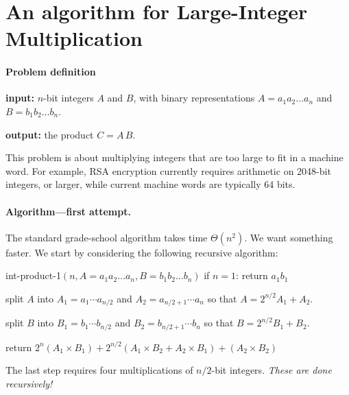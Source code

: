 
\section{An algorithm for Large-Integer Multiplication}

\paragraph{Problem definition}
\begin{mylist}
\item \textbf{input:}
  $n$-bit integers $A$ and $B$,
  with binary representations $A=a_1a_2\ldots a_n$
  and $B=b_1b_2\ldots b_n$.
\item \textbf{output:} the product $C = A \, B$.
\end{mylist}

This problem is about multiplying integers that are too large to fit in a machine word.
For example, RSA encryption currently requires arithmetic on 2048-bit integers, or larger,
while current machine words are typically 64 bits.

\paragraph{Algorithm---first attempt.}
The standard grade-school algorithm takes time $\Theta(n^2)$.
We want something faster.
We start by considering the following recursive algorithm:
\begin{myframed}
\begin{steps}
  \item[] {\sf int-product-1}$(n, A=a_1a_2\ldots a_n, B=b_1 b_2 \ldots b_n)$
    \step if $n = 1$: return $a_{1} b_{1}$

    \step split $A$ into $A_1 = a_1 \cdots a_{n/2}$ and $A_2 = a_{n/2+1} \cdots a_n$
    so that \(A = 2^{n/2} A_1 + A_2\).

    \step split $B$ into $B_1 = b_1 \cdots b_{n/2}$ and $B_2 = b_{n/2+1} \cdots b_n$
    so that \(B = 2^{n/2} B_1 + B_2\).

    \step return $2^{n} (A_1 \times B_1) + 2^{n/2}(A_1 \times B_2 + A_2 \times B_1) + (A_2\times B_2)$
  \end{steps}
\end{myframed}

The last step requires four multiplications of $n/2$-bit integers.
\emph{These are done recursively!}

